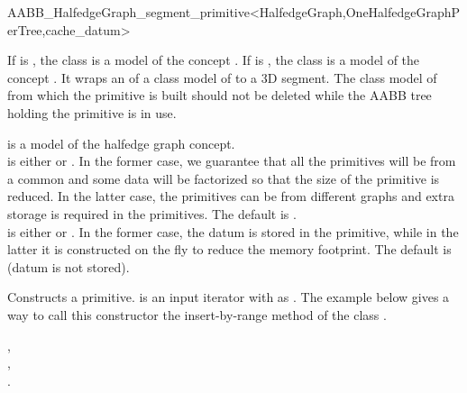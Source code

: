 \ccRefPageBegin

\begin{ccRefClass}{AABB_HalfedgeGraph_segment_primitive<HalfedgeGraph,OneHalfedgeGraphPerTree,cache_datum>}

\ccDefinition
  
If  is , the class is a model of the concept .
If  is , the class is a model of the concept .
It wraps an  of a class model of  to a 3D segment.
The class model of  from which the primitive is built should not be deleted
while the AABB tree holding the primitive is in use.



\ccParameters
{} is a model of the halfedge graph concept.\\
 is either  or . In the former case, we guarantee that all the primitives will be from a common  and some data 
will be factorized so that the size of the primitive is reduced. In the latter case, the primitives can be from different graphs and extra storage is required in the primitives. The default is .\\
 is either  or . In the former case, the datum is stored in the primitive, while in the latter it is constructed on the fly to reduce
the memory footprint. The default is  (datum is not stored).


\ccTypes
{}
\ccGlue
{}
\ccGlue
{}

\ccCreation
{}

{Constructs a primitive.  is an input iterator with  as .
The example below gives a way to call this constructor the insert-by-range method of the class .}


\ccSeeAlso

,\\
,\\
.\\


\end{ccRefClass}

\ccRefPageEnd

